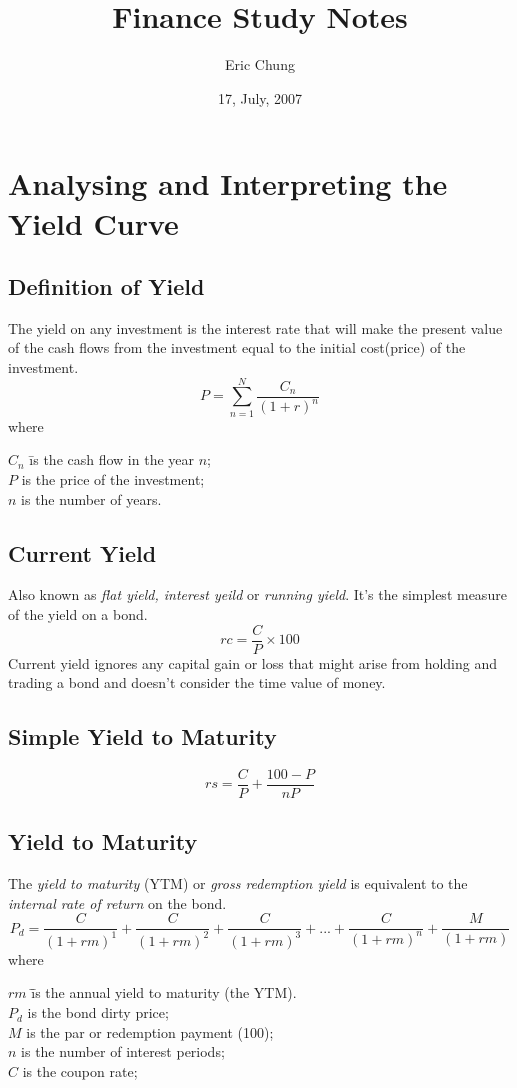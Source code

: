 \documentclass[8pt,a4paper]{article}
\begin{document}
\title{Finance Study Notes}
\author{Eric Chung}
\date{17, July, 2007}
\maketitle
\section{Analysing and Interpreting the Yield Curve}

\subsection{Definition of Yield}
The yield on any investment is the interest rate that will make the present value of the cash flows from the investment equal to the initial cost(price) of the investment.
\[P=\sum_{n=1}^N \frac{C_n}{(1+r)^n}\]
where
\begin{tabbing}
	$C_n$ \= is the cash flow in the year $n$;\\
	$P$ \> is the price of the investment;\\
	$n$ \> is the number of years.
\end{tabbing}

\subsection{Current Yield}
Also known as \textit{flat yield, interest yeild} or \textit{running yield}. It's the simplest measure of the yield on a bond.
\[rc=\frac{C}{P}\times 100\]
Current yield ignores any capital gain or loss that might arise from holding and trading a bond and doesn't consider the time value of money.

\subsection{Simple Yield to Maturity}
\[rs=\frac{C}{P}+\frac{100 - P}{nP}\]

\subsection{Yield to Maturity}

The \textit{yield to maturity} (YTM) or \textit{gross redemption yield} is equivalent to the \textit{internal rate of return} on the bond.
\[P_d=
		\frac{C}{(1+rm)^1} +
		\frac{C}{(1+rm)^2} +		
		\frac{C}{(1+rm)^3} +...+
		\frac{C}{(1+rm)^n} +		
		\frac{M}{(1+rm)}		
\] 
where
\begin{tabbing}
	$rm$ \= \= is the annual yield to maturity (the YTM).\\
	$P_d$ \> \> is the bond dirty price;\\
	$M$ \> \> is the par or redemption payment (100);\\
	$n$ \> \> is the number of interest periods;\\
	$C$ \> \> is the coupon rate;
\end{tabbing}
\end{document}

